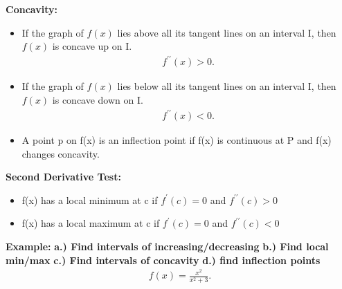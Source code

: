 \documentclass{report}
\begin{document}
   \bigbreak \noindent 
   \begin{mdframed}
     \begin{center}
       \textbf{Concavity:}
     \end{center}
     \bigbreak \noindent 
     \begin{itemize}
       \item If the graph of $f(x)$ lies above all its tangent lines on an interval I, then $f(x)$ is concave up on I.
         \begin{align*}
           f^{\prime\prime}(x) > 0 
         .\end{align*}
       \item If the graph of $f(x)$ lies below all its tangent lines on an interval I, then $f(x)$ is concave down on I.
         \begin{align*}
           f^{\prime\prime}(x) < 0 
         .\end{align*}
        \item A point p on f(x) is an inflection point if f(x) is continuous at P and f(x) changes concavity.
     \end{itemize}
   \end{mdframed}

   \bigbreak \noindent 
   \begin{mdframed}
     \begin{center}
       \textbf{Second Derivative Test:}
     \end{center}
     \bigbreak \noindent 
     \begin{itemize}
       \item f(x) has a local minimum at c if $f^{\prime}(c)=0$ and $f^{\prime\prime}(c) > 0$ 
       \item f(x) has a local maximum at c if $f^{\prime}(c)=0$ and $f^{\prime\prime}(c) < 0$ 
     \end{itemize}
   \end{mdframed}

   \bigbreak \noindent 
   \begin{mdframed}
     \textbf{Example:}
     \smallbreak \noindent
     \textbf{a.) Find intervals of increasing/decreasing}
     \smallbreak \noindent
     \textbf{b.) Find local min/max}
     \smallbreak \noindent
     \textbf{c.) Find intervals of concavity}
     \smallbreak \noindent
     \textbf{d.) find inflection points}
     \begin{align*}
       f(x) = \frac{x^{2}}{x^{2} +3}
     .\end{align*}
   \end{mdframed}
   
\end{document}
